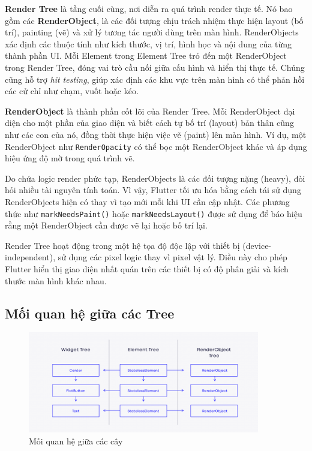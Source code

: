 \documentclass[../DoAn.tex]{subfiles}
\numberwithin{figure}{chapter}
\begin{document}
\textbf{Render Tree} là tầng cuối cùng, nơi diễn ra quá trình render thực tế. Nó bao gồm các \textbf{RenderObject}, là các đối tượng chịu trách nhiệm thực hiện layout (bố trí), painting (vẽ) và xử lý tương tác người dùng trên màn hình. RenderObjects xác định các thuộc tính như kích thước, vị trí, hình học và nội dung của từng thành phần UI. Mỗi Element trong Element Tree trỏ đến một
RenderObject trong Render Tree, đóng vai trò cầu nối giữa cấu hình và hiển thị
thực tế. Chúng cũng hỗ trợ \textit{hit testing}, giúp xác định các khu vực trên màn hình có thể phản hồi các cử chỉ như chạm, vuốt hoặc kéo. 

\textbf{RenderObject} là thành phần cốt lõi của Render Tree. Mỗi RenderObject đại diện cho một phần của giao diện và biết cách tự bố trí (layout) bản thân cũng như các con của nó, đồng thời thực hiện việc vẽ (paint) lên màn hình. Ví dụ, một RenderObject như \texttt{RenderOpacity} có thể bọc một RenderObject khác và áp dụng hiệu ứng độ mờ trong quá trình vẽ.

Do chứa logic render phức tạp, RenderObjects là các đối tượng nặng (heavy), đòi hỏi nhiều tài nguyên tính toán. Vì vậy, Flutter tối ưu hóa bằng cách tái sử dụng RenderObjects hiện có thay vì tạo mới mỗi khi UI cần cập nhật. Các phương thức như \texttt{markNeedsPaint()} hoặc \texttt{markNeedsLayout()} được sử dụng để báo hiệu rằng một RenderObject cần được vẽ lại hoặc bố trí lại.

Render Tree hoạt động trong một hệ tọa độ độc lập với thiết bị (device-independent), sử dụng các pixel logic thay vì pixel vật lý. Điều này cho phép Flutter hiển thị giao diện nhất quán trên các thiết bị có độ phân giải và kích thước màn hình khác nhau.

\subsection{Mối quan hệ giữa các Tree}

\begin{figure}[H]
    \centering
    \includegraphics[width=0.9\textwidth]{Hinhve/Chuong5/3trees.png}
    \caption{Mối quan hệ giữa các cây}
    \label{fig:3trees}
\end{figure}
\end{document}
